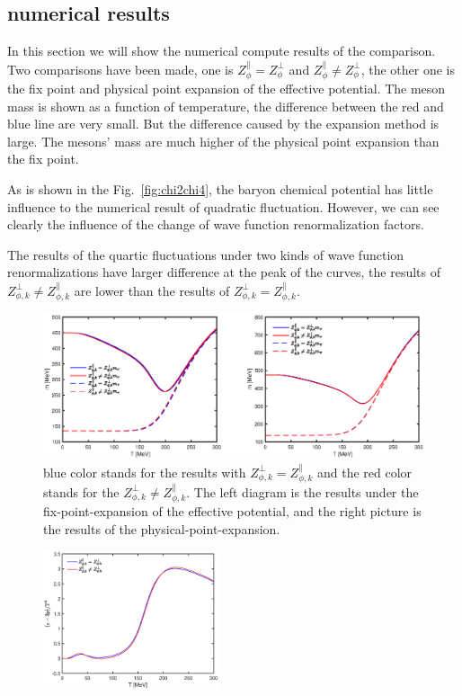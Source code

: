 \documentclass[%
reprint,
superscriptaddress,
showpacs,preprintnumbers,
 amsmath,amssymb,
 aps,
prd,
]{revtex4-1}
\def\Fig#1{Fig.~\ref{#1}} \def\Tab#1{Tab.~\ref{#1}}
\begin{document}
\subsection{numerical results}
In this section we will show the numerical compute results of the comparison. Two comparisons have been made, one is $Z^{\|}_{\phi}
=Z^{\bot}_{\phi}$ and $Z^{\|}_{\phi}\neq Z^{\bot}_{\phi}$, the other one is the fix point and physical point expansion of the effective 
potential. The meson mass is shown as a function of temperature, the difference between the red and blue line are very small. But 
the difference caused by the expansion method is large. The mesons' mass are much higher of the physical point expansion than the 
fix point. 

As is shown in the \Fig{fig:chi2chi4}, the baryon chemical potential has little influence to the numerical result of 
quadratic fluctuation. However, we can see clearly the influence of the change of wave function renormalization factors.


The results of the quartic fluctuations under two kinds of wave function renormalizations have larger difference at the peak
 of the curves, the results of $Z^{\bot}_{\phi,k}\neq Z^{\|}_{\phi,k} $ are lower than the results of $Z^{\bot}_{\phi,k}= Z^{\|}_{\phi,k} $.



\begin{figure}[t]
\label{fig:mphi}
\includegraphics[width=1.0\textwidth]{mphi.eps}
\caption{blue color stands for the results with $Z^{\bot}_{\phi,k}=Z^{\|}_{\phi,k}$ and the red color stands for the $Z^{\bot}
_{\phi,k}\neq Z^{\|}_{\phi,k} $. The left diagram is the results under the fix-point-expansion of the effective potential, and 
the right picture is the results of the physical-point-expansion.}
\end{figure}








\begin{figure}[t]
\label{fig:trace}
\includegraphics[width=0.46\textwidth]{trace.eps}
\caption{}
\end{figure}
\end{document}
